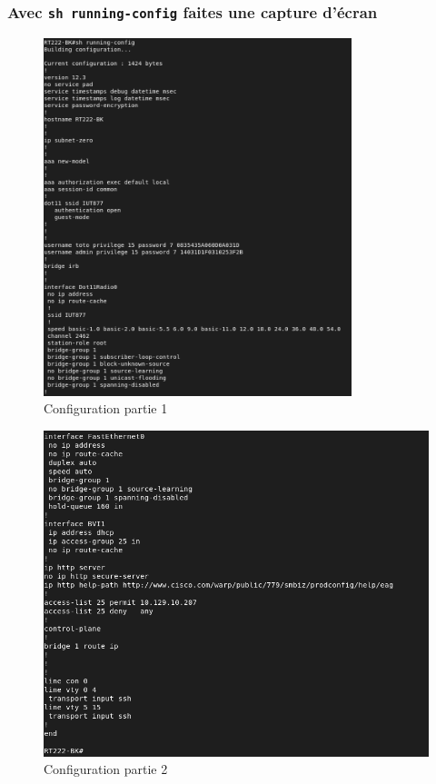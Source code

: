 \documentclass[12pt, a4paper]{article}
\begin{document}
        \subsubsection{Avec \texttt{sh running-config} faites une capture d'écran}
        \begin{figure}[H]
            \centering
            \includegraphics[width=0.8\textwidth]{img/part1.png}
            \caption{Configuration partie 1}
            \label{fig:sh1}
        \end{figure}
        \begin{figure}[H]
            \centering
            \includegraphics[width=1\textwidth]{img/part2.png}
            \caption{Configuration partie 2}
            \label{fig:sh2}
        \end{figure}
\end{document}
